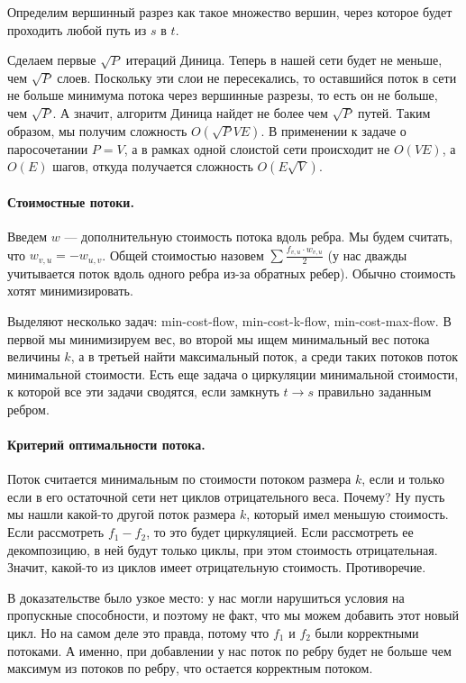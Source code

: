 \documentclass[12pt]{article}
\begin{document}
Определим вершинный разрез как такое множество вершин, через которое будет проходить любой путь из $s$ в $t$. 

Сделаем первые $\sqrt{P}$ итераций Диница. Теперь в нашей сети будет не меньше, чем $\sqrt{P}$ слоев. Поскольку эти слои не пересекались, то оставшийся поток в сети не больше минимума потока через вершинные разрезы, то есть он не больше, чем $\sqrt{P}$. А значит, алгоритм Диница найдет не более чем $\sqrt{P}$ путей. Таким образом, мы получим сложность $O(\sqrt{P} VE)$. В применении к задаче о паросочетании $P = V$, а в рамках одной слоистой сети происходит не $O(VE)$, а $O(E)$ шагов, откуда получается сложность $O(E \sqrt{V})$.

\paragraph{Стоимостные потоки.} Введем $w$ --- дополнительную стоимость потока вдоль ребра. Мы будем считать, что $w_{v, u} = -w_{u, v}$. Общей стоимостью назовем $\sum \frac{f_{v, u} \cdot w_{v, u}}{2}$ (у нас дважды учитывается поток вдоль одного ребра из-за обратных ребер). Обычно стоимость хотят минимизировать.

Выделяют несколько задач: min-cost-flow, min-cost-k-flow, min-cost-max-flow. В первой мы минимизируем вес, во второй мы ищем минимальный вес потока величины $k$, а в третьей найти максимальный поток, а среди таких потоков поток минимальной стоимости. Есть еще задача о циркуляции минимальной стоимости, к которой все эти задачи сводятся, если замкнуть $t \rightarrow s$ правильно заданным ребром.

\paragraph{Критерий оптимальности потока.} Поток считается минимальным по стоимости потоком размера $k$, если и только если в его остаточной сети нет циклов отрицательного веса. Почему? Ну пусть мы нашли какой-то другой поток размера $k$, который имел меньшую стоимость. Если рассмотреть $f_1 - f_2$, то это будет циркуляцией. Если рассмотреть ее декомпозицию, в ней будут только циклы, при этом стоимость отрицательная. Значит, какой-то из циклов имеет отрицательную стоимость. Противоречие.

В доказательстве было узкое место: у нас могли нарушиться условия на пропускные способности, и поэтому не факт, что мы можем добавить этот новый цикл. Но на самом деле это правда, потому что $f_1$ и $f_2$ были корректными потоками. А именно, при добавлении у нас поток по ребру будет не больше чем максимум из потоков по ребру, что остается корректным потоком.
\end{document}

